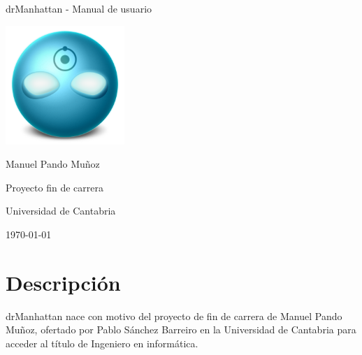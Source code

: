 \documentclass[11pt]{article}
\begin{document}

\begin{titlepage}
    \begin{ttfamily}
        \begin{center}
            \vspace*{1in}
            {\LARGE drManhattan - Manual de usuario}
            \par
            \vspace{0.5in}
            \includegraphics[width=4.5cm]{imagenes/portada}

            \vspace{0.5in}
            {\large Manuel Pando Muñoz}
            \par
            Proyecto fin de carrera
            \par
            Universidad de Cantabria
            \par
            \vspace{0.5in}
            \today
        \end{center}
    \end{ttfamily}

    \vfill

    \begin{abstract}
        El siguiente documento representa el manual de usuario para la aplicación drManhattan.
    \end{abstract}
\end{titlepage}



\cleardoublepage

\tableofcontents


\newpage

\section{Descripción}
\label{sec:descripcion}

drManhattan nace con motivo del proyecto de fin de carrera de Manuel Pando Muñoz, ofertado por Pablo Sánchez Barreiro en la Universidad de Cantabria para acceder al título de Ingeniero en informática.
\end{document}
